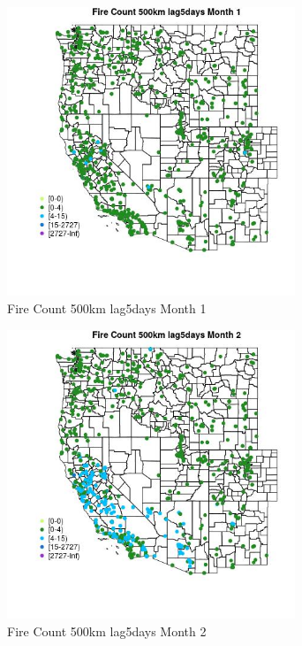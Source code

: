 \begin{figure} 
\centering  
\includegraphics[width=0.77\textwidth]{Code_Outputs/Report_ML_input_PM25_Step4_part_f_de_duplicated_aves_prioritize_24hr_obswNAs_MapObsMo1Fire_Count_500km_lag5days.jpg} 
\caption{\label{fig:Report_ML_input_PM25_Step4_part_f_de_duplicated_aves_prioritize_24hr_obswNAsMapObsMo1Fire_Count_500km_lag5days}Fire Count 500km lag5days Month 1} 
\end{figure} 
 

\clearpage 

\begin{figure} 
\centering  
\includegraphics[width=0.77\textwidth]{Code_Outputs/Report_ML_input_PM25_Step4_part_f_de_duplicated_aves_prioritize_24hr_obswNAs_MapObsMo2Fire_Count_500km_lag5days.jpg} 
\caption{\label{fig:Report_ML_input_PM25_Step4_part_f_de_duplicated_aves_prioritize_24hr_obswNAsMapObsMo2Fire_Count_500km_lag5days}Fire Count 500km lag5days Month 2} 
\end{figure} 
 

